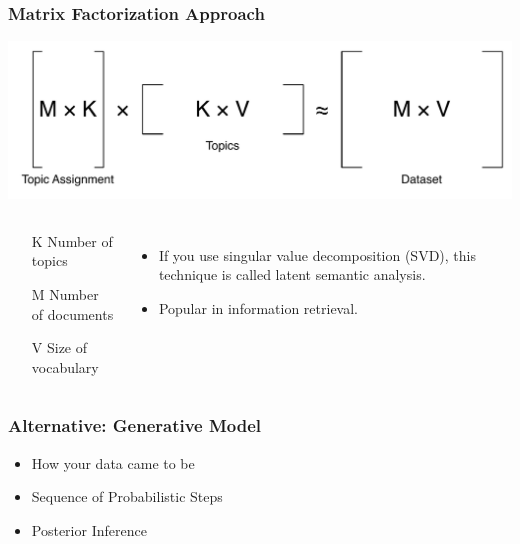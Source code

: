 \frame
{
  \frametitle{Matrix Factorization Approach}

\begin{center}
\includegraphics[width=0.9\linewidth]{topic_models/factorization.pdf}
\end{center}

\begin{columns}
\begin{block}{}
	\begin{itemize}
		\item[K] Number of topics
		\item[M] Number of documents
		\item[V] Size of vocabulary
	\end{itemize}
\end{block}
\pause
\begin{itemize}
\item If you use singular value decomposition (SVD), this technique is called latent semantic analysis.
\item Popular in information retrieval.
\end{itemize}
\end{columns}

}

\begin{frame}

\frametitle{Alternative: Generative Model}

\begin{itemize}
  \item How your data came to be
  \item Sequence of Probabilistic Steps
  \item Posterior Inference
\end{itemize}

\end{frame}

